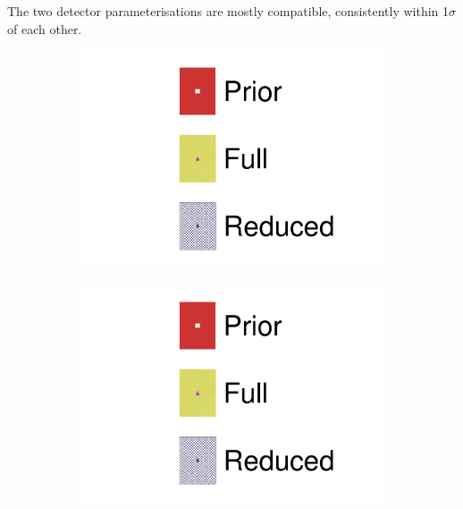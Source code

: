 The two detector parameterisations are mostly compatible, consistently within 1$\sigma$ of each other.
\begin{figure}[h]
	\centering
	\begin{subfigure}[t]{0.49\textwidth}
		\includegraphics[width=\textwidth,page=18, trim={0mm 0mm 0mm 9mm}, clip]{figures/mach3/2018/data/2018a_FixedCov_FullCov_Mpi_Data_merg_2018a_FixedCov_RedCov_Mpi_Data_merge}
	\end{subfigure}
	\begin{subfigure}[t]{0.49\textwidth}
		\includegraphics[width=\textwidth,page=19, trim={0mm 0mm 0mm 9mm}, clip]{figures/mach3/2018/data/2018a_FixedCov_FullCov_Mpi_Data_merg_2018a_FixedCov_RedCov_Mpi_Data_merge}
	\end{subfigure}
	

\end{figure}
